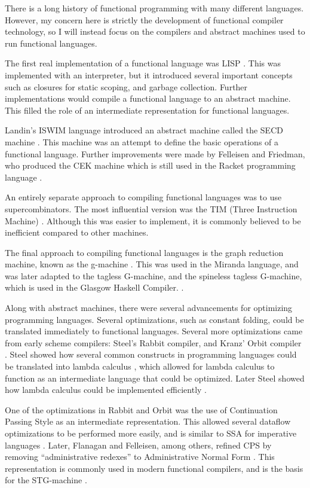 
There is a long history of functional programming with many different languages.
However, my concern here is strictly the development of functional compiler technology,
so I will instead focus on the compilers and abstract machines used to run functional languages.

The first real implementation of a functional language was LISP \cite{lisp}.
This was implemented with an interpreter, but it introduced several important concepts such as
closures for static scoping, and garbage collection.
Further implementations would compile a functional language to an abstract machine.
This filled the role of an intermediate representation for functional languages.

Landin's ISWIM language introduced an abstract machine called the SECD machine \cite{secd}.
This machine was an attempt to define the basic operations of a functional language.
Further improvements were made by Felleisen and Friedman, who produced the CEK machine which is still used in the Racket
programming language \cite{cek}.

An entirely separate approach to compiling functional languages was to use supercombinators.
The most influential version was the TIM (Three Instruction Machine) \cite{tim}.
Although this was easier to implement, it is commonly believed to be inefficient compared to other machines.

The final approach to compiling functional languages is the graph reduction machine, known as the g-machine \cite{gmachine}.
This was used in the Miranda language, and was later adapted to the tagless G-machine, and the spineless tagless G-machine,
which is used in the Glasgow Haskell Compiler. \cite{functional_PeytonJones, ghc}.

Along with abstract machines, there were several advancements for optimizing programming languages.
Several optimizations, such as constant folding, could be translated immediately to functional languages.
Several more optimizations came from early scheme compilers: Steel's Rabbit compiler, and Kranz' Orbit compiler \cite{steele78,orbit}.
Steel showed how several common constructs in programming languages could be translated into lambda calculus 
\cite{ultimate_imperative, ultimate_declarative},
which allowed for lambda calculus to function as an intermediate language that could be optimized.
Later Steel showed how lambda calculus could be implemented efficiently \cite{ lambda_rename_steel, lambda_goto}.

One of the optimizations in Rabbit and Orbit was the use of Continuation Passing Style as an intermediate representation.
This allowed several dataflow optimizations to be performed more easily, and is similar to SSA 
for imperative languages \cite{continuations_appel}.
Later, Flanagan and Felleisen, among others, refined CPS by removing ``administrative redexes'' to Administrative Normal Form
\cite{anormal_Flanagan}.
This representation is commonly used in modern functional compilers, and is the basis for the STG-machine \cite{stg-peytonJones}.

